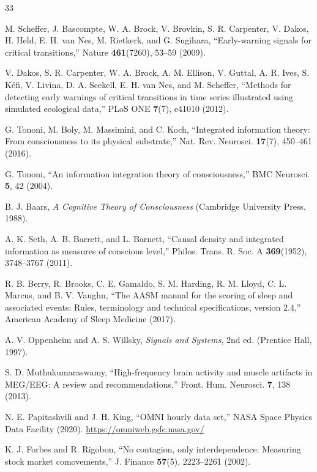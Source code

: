 \documentclass[aip,cha,reprint,amsmath,amssymb]{revtex4-2}
\begin{document}
\begin{thebibliography}{33}

 M. Scheffer, J. Bascompte, W. A. Brock, V. Brovkin, S. R. Carpenter, V. Dakos, H. Held, E. H. van Nes, M. Rietkerk, and G. Sugihara, ``Early-warning signals for critical transitions,'' Nature \textbf{461}(7260), 53--59 (2009).

 V. Dakos, S. R. Carpenter, W. A. Brock, A. M. Ellison, V. Guttal, A. R. Ives, S. K{\'e}fi, V. Livina, D. A. Seekell, E. H. van Nes, and M. Scheffer, ``Methods for detecting early warnings of critical transitions in time series illustrated using simulated ecological data,'' PLoS ONE \textbf{7}(7), e41010 (2012).

 G. Tononi, M. Boly, M. Massimini, and C. Koch, ``Integrated information theory: From consciousness to its physical substrate,'' Nat. Rev. Neurosci. \textbf{17}(7), 450--461 (2016).

 G. Tononi, ``An information integration theory of consciousness,'' BMC Neurosci. \textbf{5}, 42 (2004).

 B. J. Baars, \emph{A Cognitive Theory of Consciousness} (Cambridge University Press, 1988).

 A. K. Seth, A. B. Barrett, and L. Barnett, ``Causal density and integrated information as measures of conscious level,'' Philos. Trans. R. Soc. A \textbf{369}(1952), 3748--3767 (2011).

 R. B. Berry, R. Brooks, C. E. Gamaldo, S. M. Harding, R. M. Lloyd, C. L. Marcus, and B. V. Vaughn, ``The AASM manual for the scoring of sleep and associated events: Rules, terminology and technical specifications, version 2.4,'' American Academy of Sleep Medicine (2017).

 A. V. Oppenheim and A. S. Willsky, \emph{Signals and Systems}, 2nd ed. (Prentice Hall, 1997).

 S. D. Muthukumaraswamy, ``High-frequency brain activity and muscle artifacts in MEG/EEG: A review and recommendations,'' Front. Hum. Neurosci. \textbf{7}, 138 (2013).

 N. E. Papitashvili and J. H. King, ``OMNI hourly data set,'' NASA Space Physics Data Facility (2020). \url{https://omniweb.gsfc.nasa.gov/}

 K. J. Forbes and R. Rigobon, ``No contagion, only interdependence: Measuring stock market comovements,'' J. Finance \textbf{57}(5), 2223--2261 (2002).


\end{thebibliography}
\end{document}
